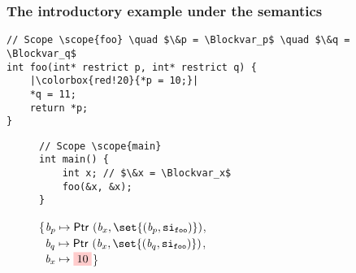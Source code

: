 \begin{frame}[fragile]
\frametitle{The introductory example under the \cinkrestrict semantics}
\begin{verbatim}
// Scope \scope{foo} \quad $\&p = \Blockvar_p$ \quad $\&q = \Blockvar_q$
int foo(int* restrict p, int* restrict q) {   
    |\colorbox{red!20}{*p = 10;}|
    *q = 11;
    return *p;
}
\end{verbatim}

\begin{figure}[h]
\centering
\begin{minipage}{.33\textwidth}
\begin{verbatim}
// Scope \scope{main}
int main() {
    int x; // $\&x = \Blockvar_x$
    foo(&x, &x);
}
\end{verbatim}
\end{minipage}%
\begin{minipage}{.67\textwidth}
\executionannotation
{\{$\Blockvar_p \mapsto \ptr{(\Blockvar_x, \set{(\Blockvar_p, \scope{foo})})}$,\\
                                            \ $\Blockvar_q \mapsto \ptr{(\Blockvar_x, \set{(\Blockvar_q, \scope{foo})})}$, \\
                                            \ $\Blockvar_x \mapsto \colorbox{red!20}{10}$\}
}
{
}
\end{minipage}
\end{figure}

\end{frame}



